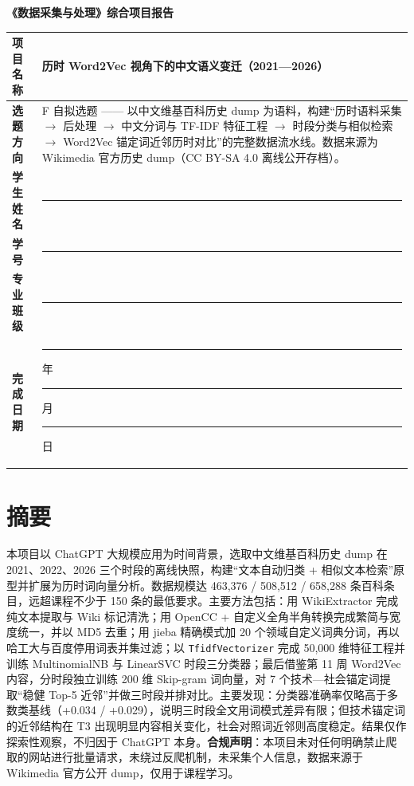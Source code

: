 \documentclass[12pt,a4paper]{article}
\begin{document}
\begin{center}
{\LARGE\bfseries 《数据采集与处理》综合项目报告}
\end{center}

\vspace{0.6em}

\begin{table}[H]
\centering
\renewcommand{\arraystretch}{1.4}
\begin{tabularx}{\textwidth}{|p{3cm}|X|}
\hline
\textbf{项目名称} & 历时 Word2Vec 视角下的中文语义变迁（2021—2026） \\
\hline
\textbf{选题方向} & F 自拟选题 —— 以中文维基百科历史 dump 为语料，构建“历时语料采集 $\rightarrow$ 后处理 $\rightarrow$ 中文分词与 TF-IDF 特征工程 $\rightarrow$ 时段分类与相似检索 $\rightarrow$ Word2Vec 锚定词近邻历时对比”的完整数据流水线。数据来源为 Wikimedia 官方历史 dump（CC BY-SA 4.0 离线公开存档）。 \\
\hline
\textbf{学生姓名} & \rule{4cm}{0.4pt} \\
\hline
\textbf{学号} & \rule{4cm}{0.4pt} \\
\hline
\textbf{专业班级} & \rule{4cm}{0.4pt} \\
\hline
\textbf{完成日期} & \rule{1.6cm}{0.4pt} 年 \rule{1cm}{0.4pt} 月 \rule{1cm}{0.4pt} 日 \\
\hline
\end{tabularx}
\end{table}

\section{摘要}

本项目以 ChatGPT 大规模应用为时间背景，选取中文维基百科历史 dump 在 2021、2022、2026 三个时段的离线快照，构建“文本自动归类 + 相似文本检索”原型并扩展为历时词向量分析。数据规模达 463,376 / 508,512 / 658,288 条百科条目，远超课程不少于 150 条的最低要求。主要方法包括：用 WikiExtractor 完成纯文本提取与 Wiki 标记清洗；用 OpenCC + 自定义全角半角转换完成繁简与宽度统一，并以 MD5 去重；用 jieba 精确模式加 20 个领域自定义词典分词，再以哈工大与百度停用词表并集过滤；以 \texttt{TfidfVectorizer} 完成 50,000 维特征工程并训练 MultinomialNB 与 LinearSVC 时段三分类器；最后借鉴第 11 周 Word2Vec 内容，分时段独立训练 200 维 Skip-gram 词向量，对 7 个技术—社会锚定词提取“稳健 Top-5 近邻”并做三时段并排对比。主要发现：分类器准确率仅略高于多数类基线（+0.034 / +0.029），说明三时段全文用词模式差异有限；但技术锚定词的近邻结构在 T3 出现明显内容相关变化，社会对照词近邻则高度稳定。结果仅作探索性观察，不归因于 ChatGPT 本身。\textbf{合规声明}：本项目未对任何明确禁止爬取的网站进行批量请求，未绕过反爬机制，未采集个人信息，数据来源于 Wikimedia 官方公开 dump，仅用于课程学习。
\end{document}

